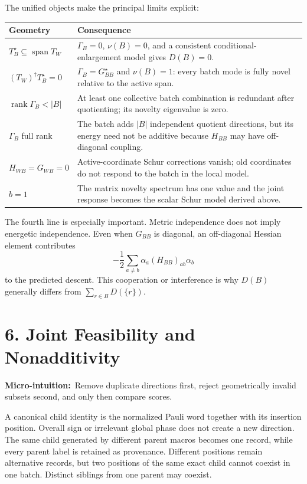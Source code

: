 \documentclass[10pt,twocolumn]{article}
\newcommand{\micro}[1]{\par\noindent\textbf{Micro-intuition:}\ #1\par}
\begin{document}
The unified objects make the principal limits explicit:
\begin{center}
\begin{tabular}{p{}p{}}
\textbf{Geometry} & \textbf{Consequence}\\\hline
\(T_B^\star\subseteq\operatorname{span}T_W\)
&\(\Gamma_B=0\), \(\nu(B)=0\), and a consistent conditional-enlargement
model gives \(D(B)=0\).\\
\((T_W)^\dagger T_B^\star=0\)
&\(\Gamma_B=G_{BB}^\star\) and \(\nu(B)=1\): every batch mode
is fully novel relative to the active span.\\
\(\operatorname{rank}\Gamma_B<|B|\)
&At least one collective batch combination is redundant after quotienting;
its novelty eigenvalue is zero.\\
\(\Gamma_B\) full rank
&The batch adds \(|B|\) independent quotient directions, but its energy need
not be additive because \(H_{BB}\) may have off-diagonal coupling.\\
\(H_{WB}=G_{WB}=0\)
&Active-coordinate Schur corrections vanish; old coordinates do not respond
to the batch in the local model.\\
\(b=1\)
&The matrix novelty spectrum has one value and the joint response becomes the
scalar Schur model derived above.
\end{tabular}
\end{center}

The fourth line is especially important. Metric independence does not imply
energetic independence. Even when \(G_{BB}\) is diagonal, an off-diagonal
Hessian element contributes
\[
-\frac12\sum_{a\ne b}\alpha_a(H_{BB})_{ab}\alpha_b
\]
to the predicted descent. This cooperation or interference is why
\(D(B)\) generally differs from
\(\sum_{r\in B}D(\{r\})\).

\section*{6. Joint Feasibility and Nonadditivity}

\micro{Remove duplicate directions first, reject geometrically invalid subsets
second, and only then compare scores.}

A canonical child identity is the normalized Pauli word together with its
insertion position. Overall sign or irrelevant global phase does not create a
new direction. The same child generated by different parent macros becomes one
record, while every parent label is retained as provenance. Different positions
remain alternative records, but two positions of the same exact child cannot
coexist in one batch. Distinct siblings from one parent may coexist.
\end{document}
